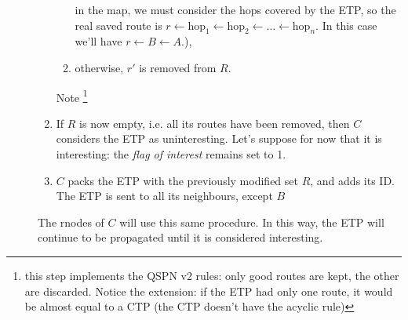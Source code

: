 \documentclass[a4paper]{article}
\newcommand{\T}[1]{\textrm{#1}}
\begin{document}
\begin{description}
\begin{enumerate}
\begin{enumerate}
{				in the map, we must consider the hops covered by the ETP,
				so the real saved route is
				$r\leftarrow \T{hop}_1\leftarrow \T{hop}_2\leftarrow
				\dots\leftarrow \T{hop}_n$. In this
				case we'll have $r\leftarrow B\leftarrow A$.}), 
			\item otherwise, $r'$ is removed from $R$.
		\end{enumerate}
		Note \footnote{this step implements the QSPN v2 rules: only
		good routes are kept, the other are discarded. Notice
		the extension: if the ETP had only one route, it would be
		almost equal to a CTP (the CTP doesn't have the acyclic rule)}
	\item If $R$ is now empty, i.e. all its routes have been removed, then
		$C$ considers the ETP as uninteresting. Let's suppose for now
		that it is interesting: the \emph{flag of interest} remains
		set to	1.
	\item $C$ packs the ETP with the previously modified
		set $R$, and adds its ID. The ETP is sent to all its neighbours,
		except $B$
	\end{enumerate}
	The rnodes of $C$ will use this same procedure. In this way, the ETP
	will continue to be propagated until it is considered interesting.


\end{description}
\end{document}
